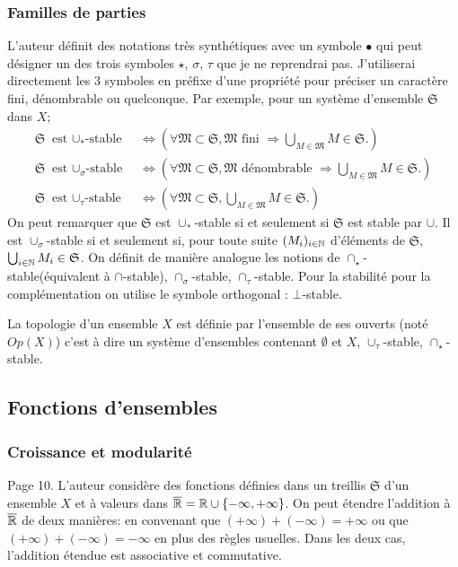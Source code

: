 \subsubsection{Familles de parties}
L'auteur définit des notations très synthétiques avec un symbole $\bullet$ qui peut désigner un des trois symboles $\star$, $\sigma$, $\tau$ que je ne reprendrai pas. J'utiliserai directement les 3 symboles en préfixe d'une propriété pour préciser un caractère fini, dénombrable ou quelconque. Par exemple, pour un système d'ensemble $\mathfrak{S}$ dans $X$;
\begin{align*}
\mathfrak{S} \text{ est $\cup_*$-stable } &\Leftrightarrow \left( \forall \mathfrak{M} \subset \mathfrak{S}, \mathfrak{M} \text{ fini } \Rightarrow \bigcup_{M \in \mathfrak{M}}M \in \mathfrak{S}.\right) \\
\mathfrak{S} \text{ est $\cup_\sigma$-stable } &\Leftrightarrow \left( \forall \mathfrak{M} \subset \mathfrak{S}, \mathfrak{M} \text{ dénombrable } \Rightarrow \bigcup_{M \in \mathfrak{M}}M \in \mathfrak{S}.\right) \\
\mathfrak{S} \text{ est $\cup_\tau$-stable } &\Leftrightarrow \left( \forall \mathfrak{M} \subset \mathfrak{S}, \bigcup_{M \in \mathfrak{M}}M \in \mathfrak{S}.\right)
\end{align*}
On peut remarquer que $\mathfrak{S}$ est $\cup_*$-stable si et seulement si $\mathfrak{S}$ est stable par $\cup$. Il est $\cup_\sigma$-stable si et seulement si, pour toute suite $(M_i)_{i\in \mathbb{N}}$ d'éléments de $\mathfrak{S}$, $\bigcup_{i\in \mathbb{N}}M_i \in \mathfrak{S}$.\newline
On définit de manière analogue les notions de $\cap_\star$-stable(équivalent à $\cap$-stable), $\cap_\sigma$-stable, $\cap_\tau$-stable. \newline
Pour la stabilité pour la complémentation on utilise le symbole orthogonal : $\bot$-stable.
\begin{exple}
 La topologie d'un ensemble $X$ est définie par l'ensemble de ses ouverts (noté $Op(X)$) c'est à dire un système d'ensembles contenant $\emptyset$ et $X$, $\cup_\tau$-stable, $\cap_\star$-stable.
\end{exple}

\subsection{Fonctions d'ensembles}\label{FoncEns}
\subsubsection{Croissance et modularité}
Page 10. L'auteur considère des fonctions définies dans un treillis $\mathfrak{S}$ d'un ensemble $X$ et à valeurs dans $\overline{\mathbb{R}}= \mathbb{R} \cup\{- \infty, + \infty\} $. On peut étendre l'addition à $\overline{\mathbb{R}}$ de deux manières: en convenant que $(+ \infty) + (-\infty) = + \infty$ ou que $(+ \infty) + (-\infty) = - \infty$ en plus des règles usuelles. Dans les deux cas, l'addition étendue est associative et commutative.

